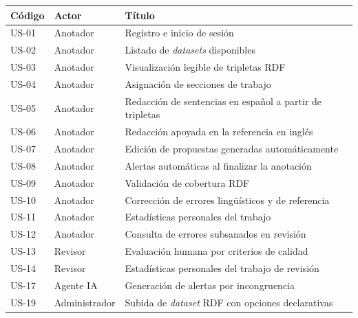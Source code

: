 \begin{table}[ht]
	\centering
	\footnotesize
	\begin{tabular}{llp{8.5cm}}
		\hline
		\textbf{Código} & \textbf{Actor}          & \textbf{Título}                                               \\
		\hline
		US-01           & Anotador                & Registro e inicio de sesión                                   \\
		US-02           & Anotador                & Listado de \textit{datasets} disponibles                      \\
		US-03           & Anotador                & Visualización legible de tripletas RDF                        \\
		US-04           & Anotador                & Asignación de secciones de trabajo                            \\
		US-05           & Anotador                & Redacción de sentencias en español a partir de tripletas      \\
		US-06           & Anotador                & Redacción apoyada en la referencia en inglés                  \\
		US-07           & Anotador                & Edición de propuestas generadas automáticamente               \\
		US-08           & Anotador                & Alertas automáticas al finalizar la anotación                 \\
		US-09           & Anotador                & Validación de cobertura RDF                                   \\
		US-10           & Anotador                & Corrección de errores lingüísticos y de referencia            \\
		US-11           & Anotador                & Estadísticas personales del trabajo                           \\
		US-12           & Anotador                & Consulta de errores subsanados en revisión                    \\
		US-13           & Revisor                 & Evaluación humana por criterios de calidad                    \\
		US-14           & Revisor                 & Estadísticas personales del trabajo de revisión               \\
		US-17           & Agente IA               & Generación de alertas por incongruencia                       \\
		US-19           & Administrador           & Subida de \textit{dataset} RDF con opciones declarativas      \\

\end{tabular}
\end{table}
